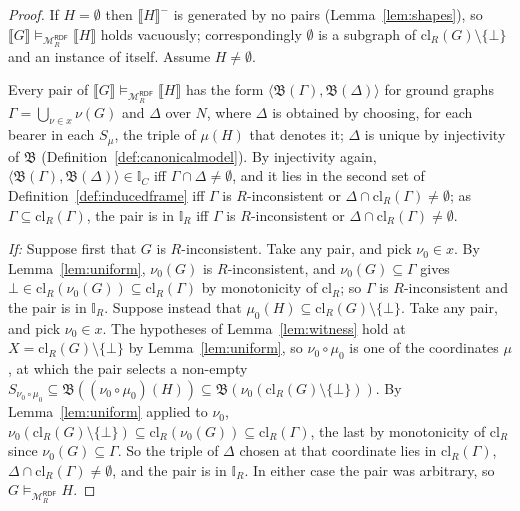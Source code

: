 \documentclass[12pt]{article}
\newcommand{\I}{\mathbb{I}}
\theoremstyle{definition}
\newcommand{\tuple}[1]{\langle #1 \rangle}
\newcommand{\sem}[1]{\llbracket #1 \rrbracket}  %
\newcommand{\bmap}{\mathfrak{B}}  %
\newcommand{\Mcal}{\mathcal{M}}   %
\newcommand{\cl}{\mathrm{cl}}   %
\begin{document}
\begin{proof}
If $H = \emptyset$ then $\sem{H}^{-}$ is generated by no pairs (Lemma~\ref{lem:shapes}), so $\sem{G} \models_{\Mcal_{R}^{\mathsf{RDF}}} \sem{H}$ holds vacuously; correspondingly $\emptyset$ is a subgraph of $\cl_R(G) \setminus \{\bot\}$ and an instance of itself. Assume $H \neq \emptyset$.

Every pair of $\sem{G} \models_{\Mcal_{R}^{\mathsf{RDF}}} \sem{H}$ has the form $\tuple{\bmap(\Gamma), \bmap(\Delta)}$ for ground graphs $\Gamma = \bigcup_{\nu \in x}\nu(G)$ and $\Delta$ over $N$, where $\Delta$ is obtained by choosing, for each bearer in each $S_{\mu}$, the triple of $\mu(H)$ that denotes it; $\Delta$ is unique by injectivity of $\bmap$ (Definition~\ref{def:canonicalmodel}). By injectivity again, $\tuple{\bmap(\Gamma), \bmap(\Delta)} \in \I_C$ iff $\Gamma \cap \Delta \neq \emptyset$, and it lies in the second set of Definition~\ref{def:inducedframe} iff $\Gamma$ is $R$-inconsistent or $\Delta \cap \cl_R(\Gamma) \neq \emptyset$; as $\Gamma \subseteq \cl_R(\Gamma)$, the pair is in $\I_R$ iff $\Gamma$ is $R$-inconsistent or $\Delta \cap \cl_R(\Gamma) \neq \emptyset$.

\textit{If:} Suppose first that $G$ is $R$-inconsistent. Take any pair, and pick $\nu_0 \in x$. By Lemma~\ref{lem:uniform}, $\nu_0(G)$ is $R$-inconsistent, and $\nu_0(G) \subseteq \Gamma$ gives $\bot \in \cl_R(\nu_0(G)) \subseteq \cl_R(\Gamma)$ by monotonicity of $\cl_R$; so $\Gamma$ is $R$-inconsistent and the pair is in $\I_R$. Suppose instead that $\mu_0(H) \subseteq \cl_R(G) \setminus \{\bot\}$. Take any pair, and pick $\nu_0 \in x$. The hypotheses of Lemma~\ref{lem:witness} hold at $X = \cl_R(G) \setminus \{\bot\}$ by Lemma~\ref{lem:uniform}, so $\nu_0 \circ \mu_0$ is one of the coordinates $\mu$, at which the pair selects a non-empty $S_{\nu_0 \circ \mu_0} \subseteq \bmap((\nu_0 \circ \mu_0)(H)) \subseteq \bmap(\nu_0(\cl_R(G) \setminus \{\bot\}))$. By Lemma~\ref{lem:uniform} applied to $\nu_0$, $\nu_0(\cl_R(G) \setminus \{\bot\}) \subseteq \cl_R(\nu_0(G)) \subseteq \cl_R(\Gamma)$, the last by monotonicity of $\cl_R$ since $\nu_0(G) \subseteq \Gamma$. So the triple of $\Delta$ chosen at that coordinate lies in $\cl_R(\Gamma)$, $\Delta \cap \cl_R(\Gamma) \neq \emptyset$, and the pair is in $\I_R$. In either case the pair was arbitrary, so $G \models_{\Mcal_{R}^{\mathsf{RDF}}} H$.


\end{proof}
\end{document}
